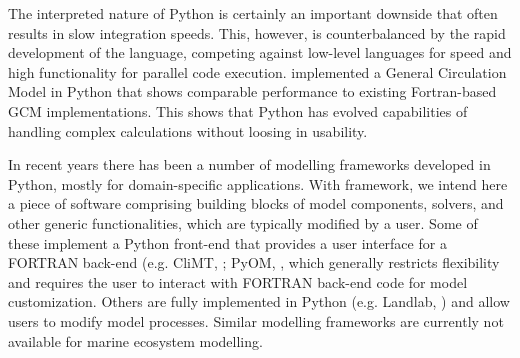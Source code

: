 \documentclass[journal abbreviation, manuscript]{copernicus}
\begin{document}
The interpreted nature of Python is certainly an important downside that often results in slow integration speeds. This, however, is counterbalanced by the rapid development of the language, competing against low-level languages for speed and high functionality for parallel code execution. \citet{Hafner2018VerosPython} implemented a General Circulation Model in Python that shows comparable performance to existing Fortran-based GCM implementations. This shows that Python has evolved capabilities of handling complex calculations without loosing in usability.

In recent years there has been a number of modelling frameworks developed in Python, mostly for domain-specific applications. With framework, we intend here a piece of software comprising building blocks of model components, solvers, and other generic functionalities, which are typically modified by a user. Some of these implement a Python front-end that provides a user interface for a FORTRAN back-end (e.g. CliMT, \citet{Monteiro2016TheToolkit}; PyOM, \citet{Eden2016ClosingModel}, which generally restricts flexibility and requires the user to interact with FORTRAN back-end code for model customization. Others are fully implemented in Python (e.g. Landlab, \citet{Hobley2017CreativeDynamics}) and allow users to  modify model processes. Similar modelling frameworks are currently not available for marine ecosystem modelling.
\end{document}
